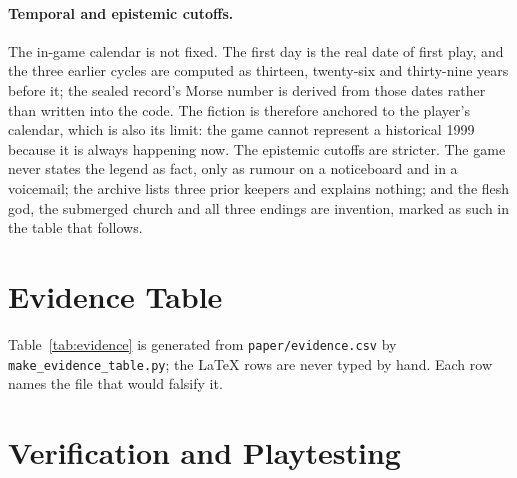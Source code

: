 \documentclass[12pt,a4paper]{article}
\begin{document}
\paragraph{Temporal and epistemic cutoffs.}
The in-game calendar is not fixed. The first day is the real date of first play,
and the three earlier cycles are computed as thirteen, twenty-six and thirty-nine
years before it; the sealed record's Morse number is derived from those dates
rather than written into the code. The fiction is therefore anchored to the
player's calendar, which is also its limit: the game cannot represent a
historical 1999 because it is always happening now. The epistemic cutoffs are
stricter. The game never states the legend as fact, only as rumour on a
noticeboard and in a voicemail; the archive lists three prior keepers and
explains nothing; and the flesh god, the submerged church and all three endings
are invention, marked as such in the table that follows.

\section{Evidence Table}

Table~\ref{tab:evidence} is generated from \texttt{paper/evidence.csv} by
\texttt{make\_evidence\_table.py}; the LaTeX rows are never typed by hand. Each
row names the file that would falsify it.

\begin{table}[htbp]
  \centering
  \scriptsize
  \singlespacing
  \renewcommand{\arraystretch}{1.0}
  
  \caption{Claims and design elements with locators, evidence tiers
  (\emph{据} documented, \emph{推断} inferred, \emph{设} invented), and limits.}
  \label{tab:evidence}
\end{table}

\section{Verification and Playtesting}
\end{document}
